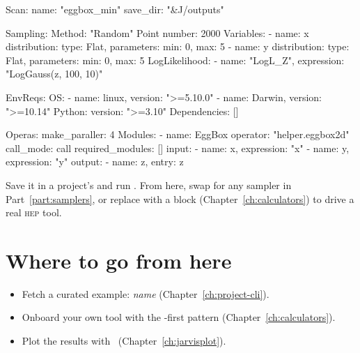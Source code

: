 \begin{yamlwin}
Scan:
  name: "eggbox_min"
  save_dir: "&J/outputs"

Sampling:
  Method: "Random"
  Point number: 2000
  Variables:
    - name: x
      distribution: {type: Flat, parameters: {min: 0, max: 5}}
    - name: y
      distribution: {type: Flat, parameters: {min: 0, max: 5}}
  LogLikelihood:
    - {name: "LogL_Z", expression: "LogGauss(z, 100, 10)"}

EnvReqs:
  OS:
    - {name: linux,  version: ">=5.10.0"}
    - {name: Darwin, version: ">=10.14"}
  Python:
    version: ">=3.10"
    Dependencies: []

Operas:
  make_paraller: 4
  Modules:
    - name: EggBox
      operator: "helper.eggbox2d"
      call_mode: call
      required_modules: []
      input:
        - {name: x, expression: "x"}
        - {name: y, expression: "y"}
      output:
        - {name: z, entry: z}
\end{yamlwin}

\noindent Save it in a project's  and run  . From
here, swap  for any sampler in Part~\ref{part:samplers}, or replace 
with a  block (Chapter~\ref{ch:calculators}) to drive a real \textsc{hep} tool.

\section{Where to go from here}
\label{sec:gal-next}

\begin{itemize}
  \item Fetch a curated example:  \textit{name}
        (Chapter~\ref{ch:project-cli}).
  \item Onboard your own tool with the -first pattern
        (Chapter~\ref{ch:calculators}).
  \item Plot the results with \JPlot\ (Chapter~\ref{ch:jarvisplot}).
\end{itemize}
